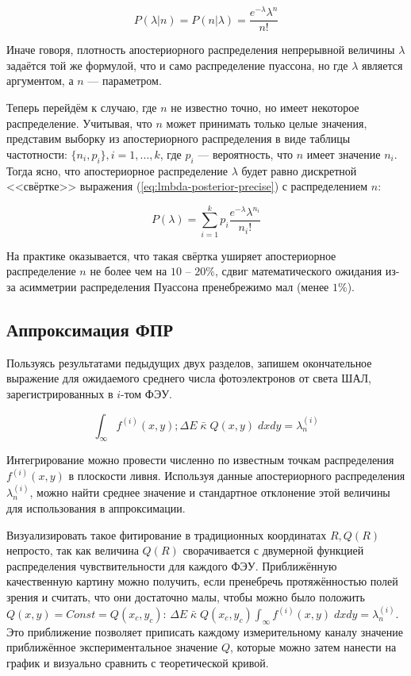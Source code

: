 \begin{equation}
	P(\lambda | n) = P(n | \lambda) = \frac{e^{-\lambda} \lambda^n}{n!}
	\label{eq:lmbda-posterior-precise}
\end{equation}

Иначе говоря, плотность апостериорного распределения непрерывной величины $\lambda$ задаётся той же формулой, что и само распределение пуассона, но где $\lambda$ является аргументом, а $n$ --- параметром.

Теперь перейдём к случаю, где $n$ не известно точно, но имеет некоторое распределение. Учитывая, что $n$ может принимать только целые значения, представим выборку из апостериорного распределения в виде таблицы частотности: $\lbrace n_i, p_i \rbrace, i = 1, ..., k$, где $p_i$ --- вероятность, что $n$ имеет значение $n_i$. Тогда ясно, что апостериорное распределение $\lambda$ будет равно дискретной <<свёртке>> выражения (\ref{eq:lmbda-posterior-precise}) с распределением $n$:

\begin{equation}
P(\lambda) = \sum_{i=1}^{k} p_i \frac{e^{-\lambda} \lambda^{n_i}}{n_i !}
\end{equation}

На практике оказывается, что такая свёртка уширяет апостериорное распределение $n$ не более чем на $10$ -- $20 \%$, сдвиг математического ожидания из-за асимметрии распределения Пуассона пренебрежимо мал (менее $1 \%$).


\subsection{Аппроксимация ФПР}

Пользуясь результатами педыдущих двух разделов, запишем окончательное выражение для ожидаемого среднего числа фотоэлектронов от света ШАЛ, зарегистрированных в $i$-том ФЭУ.

\begin{equation}
	\int_{\infty} f^{(i)}(x, y)
	; \Delta E \; \bar{\kappa} \; Q(x, y) \; dx dy = \lambda_n^{(i)}
\end{equation}

Интегрирование можно провести численно по известным точкам распределения $f^{(i)}(x, y)$ в плоскости ливня. Используя данные апостериорного распределения $\lambda_n^{(i)}$, можно найти среднее значение и стандартное отклонение этой величины для использования в аппроксимации.

Визуализировать такое фитирование в традиционных координатах $R, Q(R)$ непросто, так как величина $Q(R)$ сворачивается с двумерной функцией распределения чувствительности для каждого ФЭУ. Приближённую качественную картину можно получить, если пренебречь протяжённостью полей зрения и считать, что они достаточно малы, чтобы можно было положить $Q(x, y) = Const = Q(x_c, y_c)$: $\Delta E \; \bar{\kappa} \; Q(x_c, y_c) \int_{\infty} f^{(i)}(x, y) \; dx dy = \lambda_n^{(i)}$. Это приближение позволяет приписать каждому измерительному каналу значение приближённое экспериментальное значение $Q$, которые можно затем нанести на график и  визуально сравнить с теоретической кривой.

